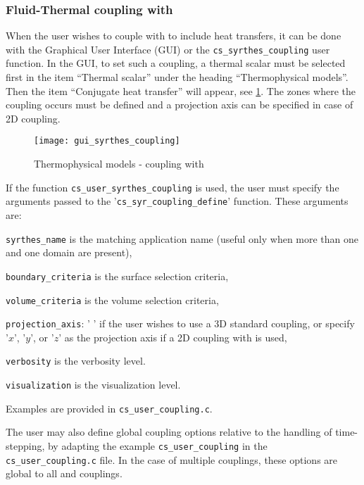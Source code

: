 {{%
\subsubsection{Fluid-Thermal coupling with \syrthes}
When the user wishes to couple \CS with \syrthes to include heat transfers, it can be
done with the Graphical User Interface (GUI) or the
\texttt{cs\_syrthes\_coupling} user function.
In the GUI, to set such a coupling, a thermal scalar must be
selected first in the item ``Thermal scalar'' under the heading ``Thermophysical models''.
 Then the item ``Conjugate heat transfer'' will appear, see \figurename\ref{fig:syrthes}.
 The zones where the coupling occurs must be defined and a projection axis can be
specified in case of 2D coupling.

\begin{figure}[ht]
\begin{center}
\texttt{[image: gui\_syrthes\_coupling]}
\caption{Thermophysical models - coupling with \syrthes}
\label{fig:syrthes}
\end{center}
\end{figure}

If the function \texttt{cs\_user\_syrthes\_coupling} is used, the user must
specify the arguments passed to the '\texttt{cs\_syr\_coupling\_define}' function.
 These arguments are:
\begin{list}{-}{}
 \item \texttt{syrthes\_name} is the matching \syrthes application name (useful only when more than one \syrthes and one \CS domain are present),
 \item \texttt{boundary\_criteria} is the surface selection criteria,
 \item \texttt{volume\_criteria} is the volume selection criteria,
 \item \texttt{projection\_axis}: ' ' if the user wishes to use a 3D standard coupling,
 or specify '$x$', '$y$', or '$z$' as the projection axis if a 2D coupling with \syrthes is used,
 \item \texttt{verbosity} is the verbosity level.
 \item \texttt{visualization} is the visualization level.
\end{list}
Examples are provided in \texttt{cs\_user\_coupling.c}.

The user may also define global coupling options relative to the handling of
time-stepping, by adapting the example \texttt{cs\_user\_coupling}
in the \texttt{cs\_user\_coupling.c} file. In the case of multiple couplings,
these options are global to all \syrthes and \CS couplings.

}}
